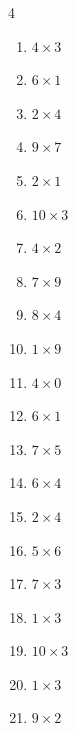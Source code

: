 \begin{multicols}{4}
\begin{enumerate}
  \item $4\times 3$
        \phantom{$=12$}

  \item $6\times 1$
        \phantom{$=6$}

  \item $2\times 4$
        \phantom{$=8$}

  \item $9\times 7$
        \phantom{$=63$}

  \item $2\times 1$
        \phantom{$=2$}

  \item $10\times 3$
        \phantom{$=30$}

  \item $4\times 2$
        \phantom{$=8$}

  \item $7\times 9$
        \phantom{$=63$}

  \item $8\times 4$
        \phantom{$=32$}

  \item $1\times 9$
        \phantom{$=9$}

\columnbreak %

  \item $4\times 0$
        \phantom{$=0$}

  \item $6\times 1$
        \phantom{$=6$}

  \item $7\times 5$
        \phantom{$=35$}

  \item $6\times 4$
        \phantom{$=24$}

  \item $2\times 4$
        \phantom{$=8$}

  \item $5\times 6$
        \phantom{$=30$}

  \item $7\times 3$
        \phantom{$=21$}

  \item $1\times 3$
        \phantom{$=3$}

  \item $10\times 3$
        \phantom{$=30$}

  \item $1\times 3$
        \phantom{$=3$}

  \item $9\times 2$
        \phantom{$=18$}


\end{enumerate}
\end{multicols}
